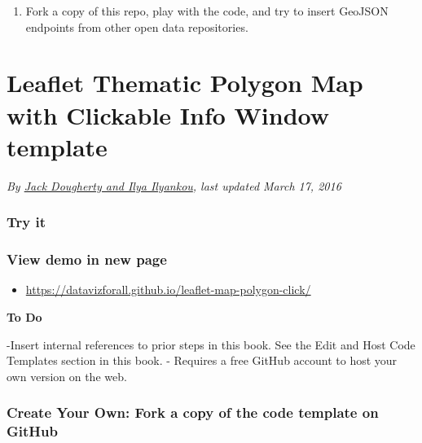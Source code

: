 \documentclass[
  english,
]{book}
\providecommand{\tightlist}{%
  \setlength{\itemsep}{0pt}\setlength{\parskip}{0pt}}
\begin{document}
\begin{enumerate}
\def\labelenumi{\arabic{enumi})}
\setcounter{enumi}{4}
\tightlist
\item
  Fork a copy of this repo, play with the code, and try to insert GeoJSON endpoints from other open data repositories.
\end{enumerate}

\hypertarget{leaflet-polygon-map-click}{%
\section{Leaflet Thematic Polygon Map with Clickable Info Window template}\label{leaflet-polygon-map-click}}

\emph{By \href{authors}{Jack Dougherty and Ilya Ilyankou}, last updated March 17, 2016}

\hypertarget{try-it-11}{%
\subsubsection*{Try it}\label{try-it-11}}

\hypertarget{view-demo-in-new-page}{%
\subsubsection*{View demo in new page}\label{view-demo-in-new-page}}

\begin{itemize}
\tightlist
\item
  \url{https://datavizforall.github.io/leaflet-map-polygon-click/}
\end{itemize}

\textbf{To Do}

-Insert internal references to prior steps in this book. See the Edit and Host Code Templates section in this book.
- Requires a free GitHub account to host your own version on the web.

\hypertarget{create-your-own-fork-a-copy-of-the-code-template-on-github}{%
\subsubsection*{Create Your Own: Fork a copy of the code template on GitHub}\label{create-your-own-fork-a-copy-of-the-code-template-on-github}}
\end{document}
